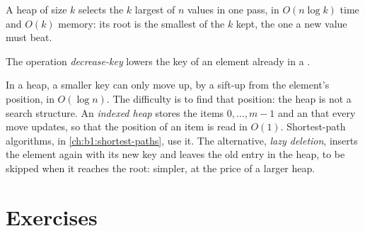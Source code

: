 \label{out:b1:heaps:stability}

A heap of size $k$ selects the $k$ largest of $n$ values in one pass, in $O(n \log k)$ time and $O(k)$ memory: its root
is the smallest of the $k$ kept, the one a new value must beat.

\label{lst:b1:heaps:topk}

\label{out:b1:heaps:topk}

\begin{definition}\label{def:b1:heaps:decrease-key}
The operation \emph{decrease-key} lowers the key of an element already in a .
\end{definition}

In a heap, a smaller key can only move up, by a sift-up from the element's position, in $O(\log n)$. The difficulty is to
find that position: the heap is not a search structure. An \emph{indexed heap} stores the items $0, \dots, m - 1$ and an
  that every move updates, so that the position of an item is read in $O(1)$. Shortest-path algorithms,
in \cref{ch:b1:shortest-paths}, use it. The alternative, \emph{lazy deletion}, inserts the element again with its new
key and leaves the old entry in the heap, to be skipped when it reaches the root: simpler, at the price of a larger heap.

\label{lst:b1:heaps:iheap}

\label{out:b1:heaps:er}


\section{Exercises}\label{sec:b1:heaps:exercises}

